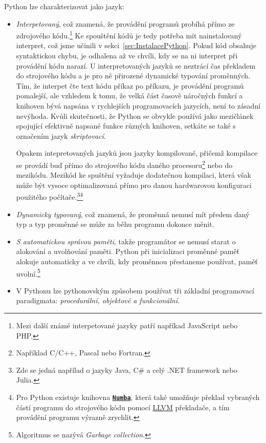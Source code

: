 \documentclass[a4paper,11pt,twoside]{article}
\def\file#1{\textnormal{\textbf{\texttt{#1}}}}
\theoremstyle{red}
\theoremstyle{green}
\begin{document}
    Python lze charakterizovat jako jazyk:
    \begin{itemize}
        \item 
            \emph{Interpetovaný}, což znamená, že provádění programů probíhá přímo ze zdrojového kódu.\footnote{
                Mezi další známé interpetované jazyky patří napříkad JavaScript nebo PHP.
            }
            Ke spouštění kódů je tedy potřeba mít nainstalovaný interpret, což jsme učinili v sekci~\ref{sec:InstalacePython}.
            Pokud kód obsahuje syntaktickou chybu, je odhalena až ve chvíli, kdy se na ni interpret při provádění kódu narazí.
            U interpretovaných jazyků se neztrácí čas překladem do strojového kódu a je pro ně přirozené dynamické typování proměnných.
            Tím, že interpet čte text kódu příkaz po příkazu, je provádění programů pomalejší, ale vzhledem k tomu, že velká část časově náročných funkcí a knihoven bývá napsána v rychlejších programovacích jazycích, není to zásadní nevýhoda.
            Kvůli skutečnosti, že Python se obvykle používá jako mezičlánek spojující efektivně napsané funkce různých knihoven, setkáte se také s označením jazyk \emph{skriptovací}.
            
            Opakem intepretovaných jazyků jsou jazyky kompilované, přičemž kompilace se provádí buď přímo do strojového kódu daného procesoru\footnote{Například C/C++, Pascal nebo Fortran.} nebo do mezikódu. 
            Mezikód ke spuštění vyžaduje dodatečnou kompilaci, která však může být vysoce optimalizovaná přímo pro danou hardwarovou konfiguraci použitého počítače.\footnote{
                Zde se jedná napřílad o jazyky Java, C\# a celý .NET framework nebo Julia.
                }\footnote{
                    Pro Python existuje knihovna \file{\href{https://numba.pydata.org/}{Numba}}, která také umožňuje překlad vybraných částí programu do strojového kódu pomocí \href{https://llvm.org/}{LLVM} překladače, a tím provádění programu výrazně zrychlit.
                }

        \item 
            \emph{Dynamicky typovaný}, což znamená, že proměnná nemusí mít předem daný typ a typ proměnné se může za běhu programu dokonce měnit.
        
        \item 
            \emph{S automatickou správou paměti}, takže programátor se nemusí starat o alokování a uvolňování paměti. 
            Python při inicializaci proměnné paměť alokuje automaticky a ve chvíli, kdy proměnnou přestaneme používat, paměť uvolní.\footnote{Algoritmus se nazývá \emph{Garbage collection}.} 

        \item
            V Pythonu lze pythonovským způsobem používat tři základní programovací paradigmata: \emph{procedurální, objektové a funkcionální}.
    \end{itemize}
         
\end{document}
